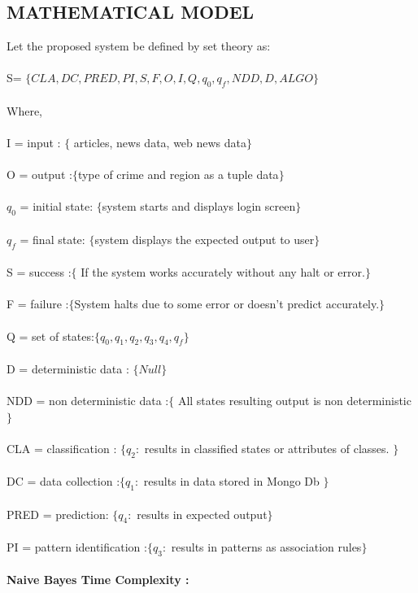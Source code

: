 \documentclass[12pt]{extreport}
\begin{document}
     \subsection{MATHEMATICAL MODEL}
     Let the proposed system be defined by set theory as:\\\\
S= $\{CLA , DC , PRED , PI , S , F , O , I , Q , q_0 , q_f , NDD , D , ALGO \}$ \\ \\
Where, \\ \\
I = input : $\{$ articles, news data, web news data$\}$ \\ \\
O = output :$\{ $type of crime and region as a tuple data$\}$ \\\\
$q_0$ = initial state: $\{$system starts and displays login screen$\}$ \\\\
$q_f$ = final state: $\{$system displays the expected output to user$\}$ \\\\
S = success :$\{$ If the system works accurately without any halt or error.$\}$ \\\\
F = failure :$\{$System halts due to some error or doesn't predict accurately.$\}$\\\\
Q = set of states:$ \{q_0, q_1, q_2, q_3, q_4, q_f\} $\\\\
D = deterministic data : $\{ Null\}$ \\\\
NDD = non deterministic data :$\{$ All states resulting output is non deterministic$\}$\\\\
CLA = classification : $\{ q_2:$ results in classified states or attributes of classes. $\}$\\\\
DC = data collection :$\{ q_1:$ results in data stored in Mongo Db $\}$\\\\
PRED = prediction: $\{q_4:$ results in expected output$\}$\\\\
PI = pattern identification :$\{ q_3:$ results in patterns as association rules$\}$ \\\\
\noindent
\textbf{Naive Bayes Time Complexity : }\\
\end{document}
